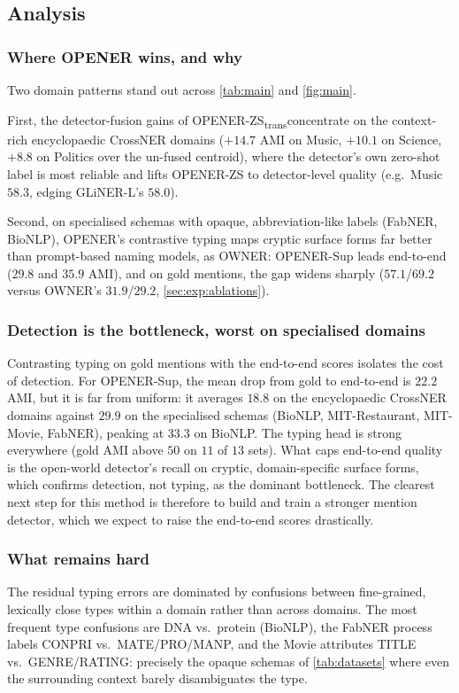 \documentclass[pdflatex,sn-basic,Numbered]{sn-jnl}
\newcommand{\zstr}{OPENER-ZS\textsubscript{trans}}
\begin{document}
\subsection{Analysis}
\label{sec:exp:analysis}

\subsubsection{Where OPENER wins, and why}
Two domain patterns stand out across \autoref{tab:main} and \autoref{fig:main}.

First, the detector-fusion gains of \zstr concentrate on the context-rich encyclopaedic CrossNER domains ($+14.7$ AMI on Music, $+10.1$ on Science, $+8.8$ on Politics over the un-fused centroid), where the detector's own zero-shot label is most reliable and lifts OPENER-ZS to detector-level quality (e.g.\ Music $58.3$, edging GLiNER-L's $58.0$).

Second, on specialised schemas with opaque, abbreviation-like labels (FabNER, BioNLP), OPENER's contrastive typing maps cryptic surface forms far better than prompt-based naming models, as OWNER: OPENER-Sup leads end-to-end ($29.8$ and $35.9$ AMI), and on gold mentions, the gap widens sharply ($57.1$/$69.2$ versus OWNER's $31.9$/$29.2$, \autoref{sec:exp:ablations}).


\subsubsection{Detection is the bottleneck, worst on specialised domains}
Contrasting typing on gold mentions with the end-to-end scores isolates the cost of detection.
For OPENER-Sup, the mean drop from gold to end-to-end is $22.2$ AMI, but it is far from uniform: it averages $18.8$ on the encyclopaedic CrossNER domains against $29.9$ on the specialised schemas (BioNLP, MIT-Restaurant, MIT-Movie, FabNER), peaking at $33.3$ on BioNLP.
The typing head is strong everywhere (gold AMI above $50$ on $11$ of $13$ sets). What caps end-to-end quality is the open-world detector's recall on cryptic, domain-specific surface forms, which confirms detection, not typing, as the dominant bottleneck. The clearest next step for this method is therefore to build and train a stronger mention detector, which we expect to raise the end-to-end scores drastically.

\subsubsection{What remains hard}
The residual typing errors are dominated by confusions between fine-grained, lexically close types within a domain rather than across domains.
The most frequent type confusions are DNA vs.\ protein (BioNLP), the FabNER process labels CONPRI vs.\ MATE/PRO/MANP, and the Movie attributes TITLE vs.\ GENRE/RATING: precisely the opaque schemas of \autoref{tab:datasets} where even the surrounding context barely disambiguates the type.
\end{document}
